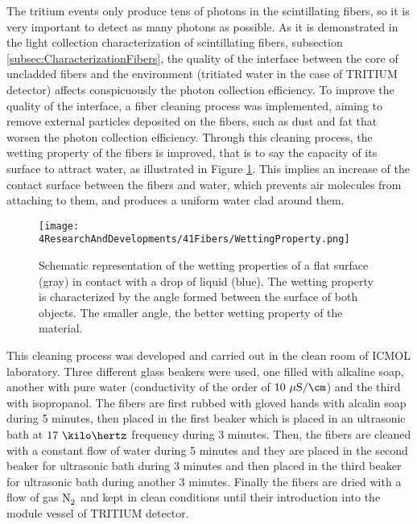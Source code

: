 
The tritium events only produce tens of photons in the scintillating fibers, so it is very important to detect as many photons as possible. As it is demonstrated in the light collection characterization of scintillating fibers, subsection \ref{subsec:CharacterizationFibers}, the quality of the interface between the core of uncladded fibers and the environment (tritiated water in the case of TRITIUM detector) affects conspicuously the photon collection efficiency. To improve the quality of the interface, a fiber cleaning process was implemented, aiming to remove external particles deposited on the fibers, such as dust and fat that worsen the photon collection efficiency.  Through this cleaning process, the wetting property of the fibers is improved, that is to say the capacity of its surface to attract water, as illustrated in Figure \ref{fig:WettingProperty}. This implies an increase of the contact surface between the fibers and water, which prevents air molecules from attaching to them, and produces a uniform water clad around them.


\begin{figure}[h]
\centering
\texttt{[image: 4ResearchAndDevelopments/41Fibers/WettingProperty.png]}
\caption{Schematic representation of the wetting properties of a flat surface (gray) in contact with a drop of liquid (blue). The wetting property is characterized by the angle formed between the surface of both objects. The smaller angle, the better wetting property of the material. \cite{WettingProperty}\label{fig:WettingProperty}}
\end{figure}

This cleaning process  was developed and carried out in the clean room of ICMOL laboratory. Three different glass beakers were used, one filled with alkaline soap, another with pure water (conductivity of the order of $10~\mu\text{S}/\cm$) and the third with isopropanol. The fibers are first rubbed with gloved hands with alcalin soap during 5 minutes, then placed in the first beaker which is placed in an ultrasonic bath at $17~\kilo\hertz$ frequency during 3 minutes. Then, the fibers are cleaned with a constant flow of water during 5 minutes and they are placed in the second beaker for ultrasonic bath during 3 minutes and then placed in the third beaker for ultrasonic bath during another 3 minutes. Finally the fibers are dried with a flow of gas $\ce{N_2}$ and kept in clean conditions until their introduction into the module vessel of TRITIUM detector.

